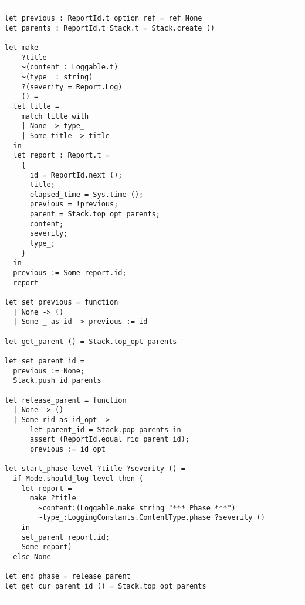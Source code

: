\vspace{2em}
\noindent\rule{\textwidth}{0.5pt}
\vspace{-0.6cm}
\begin{verbatim}
let previous : ReportId.t option ref = ref None
let parents : ReportId.t Stack.t = Stack.create ()

let make
    ?title
    ~(content : Loggable.t)
    ~(type_ : string)
    ?(severity = Report.Log)
    () =
  let title =
    match title with
    | None -> type_
    | Some title -> title
  in
  let report : Report.t =
    {
      id = ReportId.next ();
      title;
      elapsed_time = Sys.time ();
      previous = !previous;
      parent = Stack.top_opt parents;
      content;
      severity;
      type_;
    }
  in
  previous := Some report.id;
  report

let set_previous = function
  | None -> ()
  | Some _ as id -> previous := id

let get_parent () = Stack.top_opt parents

let set_parent id =
  previous := None;
  Stack.push id parents

let release_parent = function
  | None -> ()
  | Some rid as id_opt ->
      let parent_id = Stack.pop parents in
      assert (ReportId.equal rid parent_id);
      previous := id_opt

let start_phase level ?title ?severity () =
  if Mode.should_log level then (
    let report =
      make ?title
        ~content:(Loggable.make_string "*** Phase ***")
        ~type_:LoggingConstants.ContentType.phase ?severity ()
    in
    set_parent report.id;
    Some report)
  else None

let end_phase = release_parent
let get_cur_parent_id () = Stack.top_opt parents
\end{verbatim}
\vspace{-0.4cm}
\noindent\rule{\textwidth}{0.5pt}
\vspace{-0.6cm}
%
\label{lst:reportbuilder}

